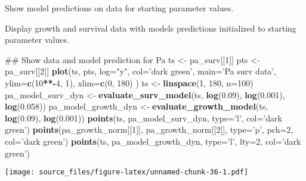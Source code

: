 \documentclass[]{article}
\newenvironment{Shaded}{\begin{snugshade}}{\end{snugshade}}
\newcommand{\KeywordTok}[1]{\textcolor[rgb]{0.13,0.29,0.53}{\textbf{#1}}}
\newcommand{\DataTypeTok}[1]{\textcolor[rgb]{0.13,0.29,0.53}{#1}}
\newcommand{\DecValTok}[1]{\textcolor[rgb]{0.00,0.00,0.81}{#1}}
\newcommand{\FloatTok}[1]{\textcolor[rgb]{0.00,0.00,0.81}{#1}}
\newcommand{\StringTok}[1]{\textcolor[rgb]{0.31,0.60,0.02}{#1}}
\newcommand{\OperatorTok}[1]{\textcolor[rgb]{0.81,0.36,0.00}{\textbf{#1}}}
\newcommand{\NormalTok}[1]{#1}
\begin{document}
Show model predictions on data for starting parameter values.

Display growth and survival data with models predictions initialized to
starting parameter values.

\begin{Shaded}
\begin{Highlighting}[]
\NormalTok{## Show data and model prediction for Pa}
\NormalTok{ts <-}\StringTok{ }\NormalTok{pa_surv[[}\DecValTok{1}\NormalTok{]]}
\NormalTok{pts <-}\StringTok{ }\NormalTok{pa_surv[[}\DecValTok{2}\NormalTok{]]}
\KeywordTok{plot}\NormalTok{(ts, pts, }
     \DataTypeTok{log=}\StringTok{"y"}\NormalTok{, }
     \DataTypeTok{col=}\StringTok{'dark green'}\NormalTok{, }
     \DataTypeTok{main=}\StringTok{'Pa surv data'}\NormalTok{, }
     \DataTypeTok{ylim=}\KeywordTok{c}\NormalTok{(}\DecValTok{10}\OperatorTok{**-}\DecValTok{4}\NormalTok{, }\DecValTok{1}\NormalTok{),}
     \DataTypeTok{xlim=}\KeywordTok{c}\NormalTok{(}\DecValTok{0}\NormalTok{, }\DecValTok{180}\NormalTok{)}
\NormalTok{     )}
\NormalTok{ts <-}\StringTok{ }\KeywordTok{linspace}\NormalTok{(}\DecValTok{1}\NormalTok{, }\DecValTok{180}\NormalTok{, }\DataTypeTok{n=}\DecValTok{100}\NormalTok{)}
\NormalTok{pa_model_surv_dyn <-}\StringTok{ }\KeywordTok{evaluate_surv_model}\NormalTok{(ts, }\KeywordTok{log}\NormalTok{(}\FloatTok{0.09}\NormalTok{), }\KeywordTok{log}\NormalTok{(}\FloatTok{0.001}\NormalTok{), }\KeywordTok{log}\NormalTok{(}\FloatTok{0.058}\NormalTok{))}
\NormalTok{pa_model_growth_dyn <-}\StringTok{ }\KeywordTok{evaluate_growth_model}\NormalTok{(ts, }\KeywordTok{log}\NormalTok{(}\FloatTok{0.09}\NormalTok{), }\KeywordTok{log}\NormalTok{(}\FloatTok{0.001}\NormalTok{))}
\KeywordTok{points}\NormalTok{(ts, pa_model_surv_dyn, }\DataTypeTok{type=}\StringTok{'l'}\NormalTok{, }\DataTypeTok{col=}\StringTok{'dark green'}\NormalTok{)}
\KeywordTok{points}\NormalTok{(pa_growth_norm[[}\DecValTok{1}\NormalTok{]], pa_growth_norm[[}\DecValTok{2}\NormalTok{]], }\DataTypeTok{type=}\StringTok{'p'}\NormalTok{, }\DataTypeTok{pch=}\DecValTok{2}\NormalTok{, }\DataTypeTok{col=}\StringTok{'dark green'}\NormalTok{)}
\KeywordTok{points}\NormalTok{(ts, pa_model_growth_dyn, }\DataTypeTok{type=}\StringTok{'l'}\NormalTok{, }\DataTypeTok{lty=}\DecValTok{2}\NormalTok{, }\DataTypeTok{col=}\StringTok{'dark green'}\NormalTok{)}
\end{Highlighting}
\end{Shaded}

\texttt{[image: source\_files/figure-latex/unnamed-chunk-36-1.pdf]}
\end{document}
